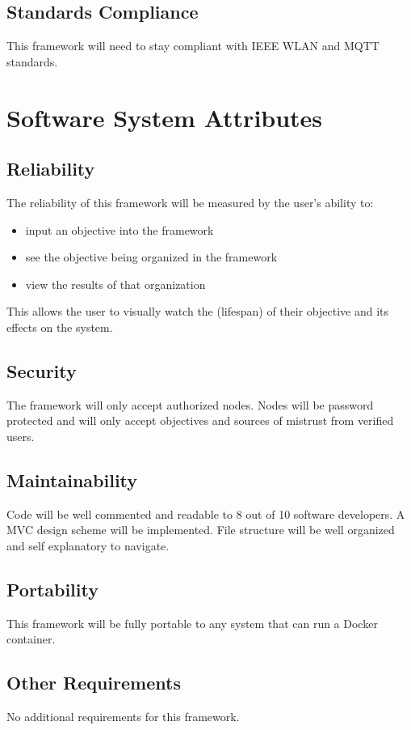 \documentclass[draftclsnofoot, onecolumn, compsoc, 10pt]{IEEEtran}
\begin{document}
\subsection{Standards Compliance}
This framework will need to stay compliant with IEEE WLAN and MQTT standards.



\section{Software System Attributes}
\subsection{Reliability}


The reliability of this framework will be measured by the user's ability to:
\begin{itemize}
\item input an objective into the framework
\item see the objective being organized in the framework
\item view the results of that organization
\end{itemize} 
This allows the user to visually watch the (lifespan) of their objective and its effects on the system.


\subsection{Security}
The framework will only accept authorized nodes. Nodes will be password protected and will only accept objectives and sources of mistrust from verified users.

\subsection{Maintainability}
Code will be well commented and readable to 8 out of 10 software developers. A MVC design scheme will be implemented. File structure will be well organized and self explanatory to navigate.


\subsection{Portability}
This framework will be fully portable to any system that can run a Docker container. 

\subsection{Other Requirements}
No additional requirements for this framework.
\end{document}
